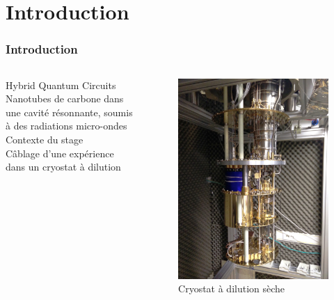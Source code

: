 \documentclass[8pt,a9paper]{beamer} \usepackage[utf8]{inputenc} \usepackage[francais]{babel} \usepackage[T1]{fontenc}
\begin{document}
\section*{Introduction}
\begin{frame}
    \frametitle{Introduction}
    \begin{columns}[T]
    \begin{column}{0.6\textwidth}
    {\large Hybrid Quantum Circuits} \vspace*{1mm}\\Nanotubes de carbone dans une cavité résonnante, soumis à des radiations micro-ondes
    \\[ 5mm]
    {\large Contexte du stage} \vspace*{1mm}\\
    Câblage d'une expérience dans un cryostat à dilution
    
    \end{column}
    \begin{column}{0.4\textwidth}
        \begin{figure}[H]
            \includegraphics[width=\textwidth]{Images/Global}
            \vspace*{-3mm}\caption{Cryostat à dilution sèche}
        \end{figure}
    \end{column}
    \end{columns}
\end{frame}
\end{document}
